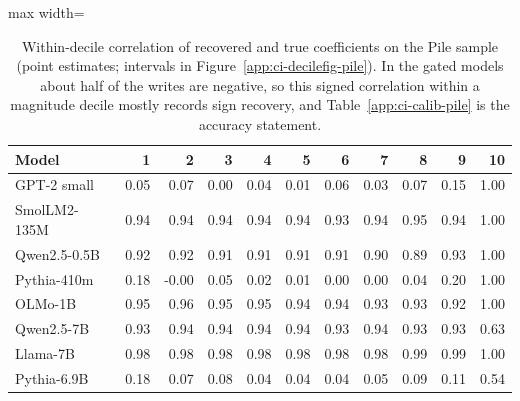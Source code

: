 \begin{table}[H]\centering\scriptsize
\caption{Within-decile correlation of recovered and true coefficients on the Pile sample (point estimates; intervals in Figure~\ref{app:ci-decilefig-pile}). In the gated models about half of the writes are negative, so this signed correlation within a magnitude decile mostly records sign recovery, and Table~\ref{app:ci-calib-pile} is the accuracy statement.}\label{app:ci-deciles-pile}
\begin{adjustbox}{max width=\linewidth}
\begin{tabular}{lrrrrrrrrrr}\toprule
Model & 1 & 2 & 3 & 4 & 5 & 6 & 7 & 8 & 9 & 10 \\ \midrule
GPT-2 small & 0.05 & 0.07 & 0.00 & 0.04 & 0.01 & 0.06 & 0.03 & 0.07 & 0.15 & 1.00 \\
SmolLM2-135M & 0.94 & 0.94 & 0.94 & 0.94 & 0.94 & 0.93 & 0.94 & 0.95 & 0.94 & 1.00 \\
Qwen2.5-0.5B & 0.92 & 0.92 & 0.91 & 0.91 & 0.91 & 0.91 & 0.90 & 0.89 & 0.93 & 1.00 \\
Pythia-410m & 0.18 & -0.00 & 0.05 & 0.02 & 0.01 & 0.00 & 0.00 & 0.04 & 0.20 & 1.00 \\
OLMo-1B & 0.95 & 0.96 & 0.95 & 0.95 & 0.94 & 0.94 & 0.93 & 0.93 & 0.92 & 1.00 \\
Qwen2.5-7B & 0.93 & 0.94 & 0.94 & 0.94 & 0.94 & 0.93 & 0.94 & 0.93 & 0.93 & 0.63 \\
Llama-7B & 0.98 & 0.98 & 0.98 & 0.98 & 0.98 & 0.98 & 0.98 & 0.99 & 0.99 & 1.00 \\
Pythia-6.9B & 0.18 & 0.07 & 0.08 & 0.04 & 0.04 & 0.04 & 0.05 & 0.09 & 0.11 & 0.54 \\
\bottomrule\end{tabular}\end{adjustbox}
\end{table}
